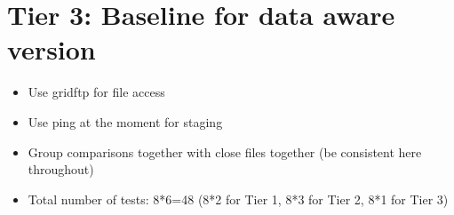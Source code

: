 \documentclass[a4paper,12pt]{article}
\begin{document}
\section{Tier 3: Baseline for data aware version}
\begin{itemize}
\item Use gridftp for file access
\item Use ping at the moment for staging
\item Group comparisons together with close files together (be consistent here throughout)
\item Total number of tests: 8*6=48 (8*2 for Tier 1, 8*3 for Tier 2, 8*1 for Tier 3)
\end{itemize}
\end{document}
